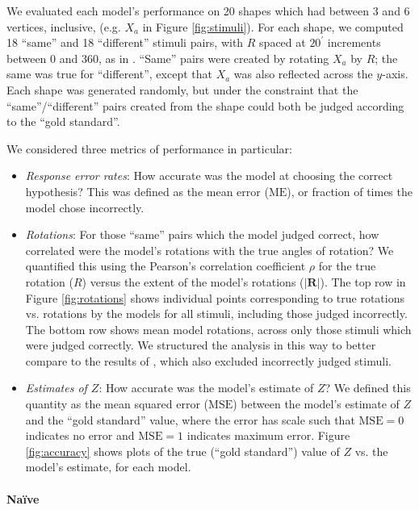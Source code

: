 \documentclass{article} %
\newcommand{\MSE}[0]{\mathrm{MSE}}
\newcommand{\ME}[0]{\mathrm{ME}}
\newcommand{\Naive}[0]{Na\"ive}
\begin{document}
We evaluated each model's performance on 20 shapes which had between 3
and 6 vertices, inclusive, (e.g. $X_a$ in Figure
\ref{fig:stimuli}). For each shape, we computed 18 ``same'' and 18
``different'' stimuli pairs, with $R$ spaced at $20^\prime$ increments
between 0 and 360, as in \cite{Shepard1971}. ``Same'' pairs were
created by rotating $X_a$ by $R$; the same was true for ``different'',
except that $X_a$ was also reflected across the $y$-axis. Each shape
was generated randomly, but under the constraint that the
``same''/``different'' pairs created from the shape could both be
judged according to the ``gold standard''.

We considered three metrics of performance in particular:
\begin{itemize}
\item \textit{Response error rates}: How accurate was the model at
  choosing the correct hypothesis? This was defined as the mean error
  ($\ME{}$), or fraction of times the model chose incorrectly.
\item \textit{Rotations}: For those ``same'' pairs which the model
  judged correct, how correlated were the model's rotations with the
  true angles of rotation?  We quantified this using the Pearson's
  correlation coefficient $\rho$ for the true rotation ($R$) versus
  the extent of the model's rotations ($\vert \mathbf{R}\vert$). The
  top row in Figure \ref{fig:rotations} shows individual points
  corresponding to true rotations vs. rotations by the models for all
  stimuli, including those judged incorrectly. The bottom row shows
  mean model rotations, across only those stimuli which were judged
  correctly. We structured the analysis in this way to better compare
  to the results of \cite{Shepard1971}, which also excluded
  incorrectly judged stimuli.
\item \textit{Estimates of $Z$}: How accurate was the model's estimate
  of $Z$? We defined this quantity as the mean squared error
  ($\MSE{}$) between the model's estimate of $Z$ and the ``gold
  standard'' value, where the error has scale such that $\MSE{}=0$
  indicates no error and $\MSE{}=1$ indicates maximum error. Figure
  \ref{fig:accuracy} shows plots of the true (``gold standard'') value
  of $Z$ vs. the model's estimate, for each model.
\end{itemize}

\paragraph{\Naive{}} 
\end{document}
